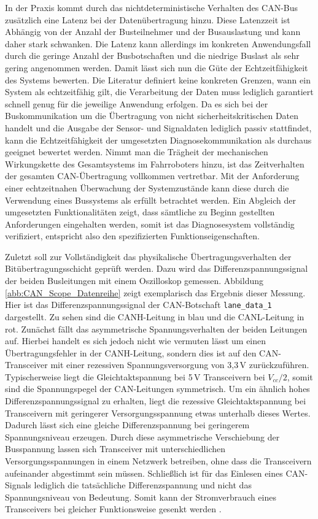 In der Praxis kommt durch das nichtdeterministische Verhalten des CAN-Bus zusätzlich eine Latenz bei der Datenübertragung hinzu. Diese Latenzzeit ist Abhängig von der Anzahl der Busteilnehmer und der Busauslastung und kann daher stark schwanken. Die Latenz kann allerdings im konkreten Anwendungsfall durch die geringe Anzahl der Busbotschaften und die niedrige Buslast als sehr gering angenommen werden. Damit lässt sich nun die Güte der Echtzeitfähigkeit des Systems bewerten. Die Literatur definiert keine konkreten Grenzen, wann ein System als echtzeitfähig gilt, die Verarbeitung der Daten muss lediglich garantiert schnell genug für die jeweilige Anwendung erfolgen. Da es sich bei der Buskommunikation um die Übertragung von nicht sicherheitskritischen Daten handelt und die Ausgabe der Sensor- und Signaldaten lediglich passiv stattfindet, kann die Echtzeitfähigkeit der umgesetzten Diagnosekommunikation als durchaus geeignet bewertet werden. Nimmt man die Trägheit der mechanischen Wirkungskette des Gesamtsystems im Fahrroboters hinzu, ist das Zeitverhalten der gesamten CAN-Übertragung vollkommen vertretbar. Mit der Anforderung einer echtzeitnahen Überwachung der Systemzustände kann diese durch die Verwendung eines Bussystems als erfüllt betrachtet werden. Ein Abgleich der umgesetzten Funktionalitäten zeigt, dass sämtliche zu Beginn gestellten Anforderungen eingehalten werden, somit ist das Diagnosesystem vollständig verifiziert, entspricht also den spezifizierten Funktionseigenschaften.

Zuletzt soll zur Vollständigkeit das physikalische Übertragungsverhalten der Bitübertragungsschicht geprüft werden. Dazu wird das Differenzspannungssignal der beiden Busleitungen mit einem Oszilloskop gemessen. Abbildung \ref{abb:CAN_Scope_Datenreihe} zeigt exemplarisch das Ergebnis dieser Messung.\\
Hier ist das Differenzspannungssignal der CAN-Botschaft \texttt{lane\_data\_1} dargestellt. Zu sehen sind die CANH-Leitung in blau und die CANL-Leitung in rot. Zunächst fällt das asymmetrische Spannungsverhalten der beiden Leitungen auf. Hierbei handelt es sich jedoch nicht wie vermuten lässt um einen Übertragungsfehler in der CANH-Leitung, sondern dies ist auf den CAN-Transceiver mit einer rezessiven Spannungsversorgung von 3,3\,V zurückzuführen. Typischerweise liegt die Gleichtaktspannung bei 5\,V Transceivern bei $V_{cc}/2$, somit sind die Spannungspegel der CAN-Leitungen symmetrisch. Um ein ähnlich hohes Differenzspannungssignal zu erhalten, liegt die rezessive Gleichtaktspannung bei Transceivern mit geringerer Versorgungsspannung etwas unterhalb dieses Wertes. Dadurch lässt sich eine gleiche Differenzspannung bei geringerem Spannungsniveau erzeugen. Durch diese asymmetrische Verschiebung der Busspannung lassen sich Transceiver mit unterschiedlichen Versorgungsspannungen in einem Netzwerk betreiben, ohne dass die Transceivern aufeinander abgestimmt sein müssen. Schließlich ist für das Einlesen eines CAN-Signals lediglich die tatsächliche Differenzspannung und nicht das Spannungsniveau von Bedeutung. Somit kann der Stromverbrauch eines Transceivers bei gleicher Funktionsweise gesenkt werden \cite{Blackman.2013}.\\

